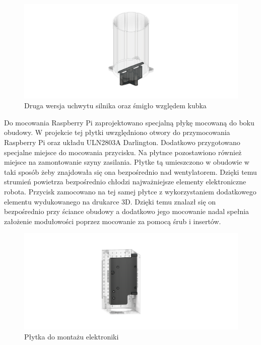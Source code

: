 \begin{figure}[H]
    \centering
    \includegraphics[width=0.95\linewidth]{chapters/03-praca-wlasna/figures/uchwyt_v2.png}
    \caption{\label{fig:uchwyt}Druga wersja uchwytu silnika oraz śmigło względem kubka}
\end{figure}

Do mocowania Raspberry Pi zaprojektowano specjalną płykę mocowaną do boku obudowy. W projekcie tej płytki uwzględniono otwory do przymocowania Raspberry
Pi oraz układu ULN2803A Darlington. Dodatkowo przygotowano specjalne miejsce do mocowania przycisku. Na płytnce pozostawiono również miejsce
na zamontowanie szyny zasilania. Płytke tą umieszczono w obudowie w taki sposób żeby znajdowała się ona bezpośrednio nad wentylatorem. Dzięki temu
strumień powietrza bezpośrednio chłodzi najważniejsze elementy elektroniczne robota. Przycisk zamocowano na tej samej płytce z wykorzystaniem
dodatkowego elementu wydukowanego na drukarce 3D. Dzięki temu znalazł się on bezpośrednio przy ściance obudowy a dodatkowo jego mocowanie
nadal spełnia założenie modułowości poprzez mocowanie za pomocą śrub i insertów.

\begin{figure}[H]
    \centering
    \includegraphics[width=0.95\linewidth]{chapters/03-praca-wlasna/figures/main_board.png}
    \caption{\label{fig:mainboard}Płytka do montażu elektroniki}
\end{figure}

